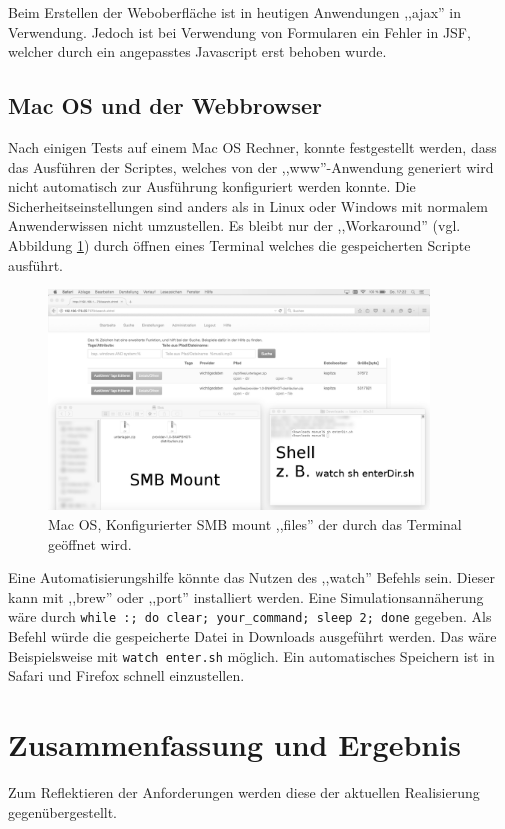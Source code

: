 \documentclass[oneside, ngerman, toc=bibliography,bibliography=totoc,listof=entryprefix, open=right,numbers=noenddot,fontsize=12pt]{scrbook}
\begin{document}
Beim Erstellen der Weboberfläche ist in heutigen Anwendungen ,,ajax'' in Verwendung. Jedoch ist bei Verwendung von Formularen ein Fehler in JSF, welcher durch ein angepasstes Javascript erst behoben wurde. 


\subsection{Mac OS und der Webbrowser}
Nach einigen Tests auf einem Mac OS Rechner, konnte festgestellt werden, dass das Ausführen der Scriptes, welches von der ,,www''-Anwendung generiert wird nicht automatisch zur Ausführung konfiguriert werden konnte. Die Sicherheitseinstellungen sind anders als in Linux oder Windows mit normalem Anwenderwissen nicht umzustellen.
Es bleibt nur der ,,Workaround'' (vgl. Abbildung \ref{fig:apple}) durch öffnen eines Terminal welches die gespeicherten Scripte ausführt.
\begin{figure}[htbp] 
    \centering
    \includegraphics[width=0.9\textwidth]{Masterarbeit_Bilder/appel_terminal.png}
    \caption{Mac OS, Konfigurierter SMB mount ,,files'' der durch das Terminal geöffnet wird. }
    \label{fig:apple}
\end{figure}  

Eine Automatisierungshilfe könnte das Nutzen des ,,watch'' Befehls sein. Dieser kann mit ,,brew'' oder ,,port'' installiert werden. 
Eine Simulationsannäherung wäre durch \verb|while :; do clear; your_command; sleep 2; done| gegeben.
Als Befehl würde die gespeicherte Datei in Downloads ausgeführt werden. Das wäre Beispielsweise mit \verb|watch enter.sh| möglich.
Ein automatisches Speichern ist in Safari und Firefox schnell einzustellen.


 
 

\section{Zusammenfassung und Ergebnis}
Zum Reflektieren der Anforderungen werden diese der aktuellen Realisierung gegenübergestellt.
\end{document}
